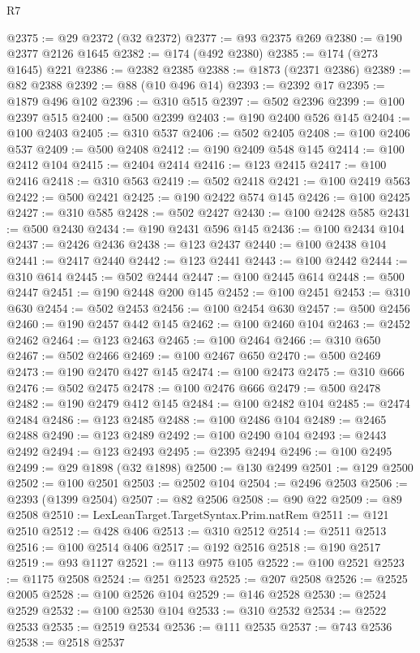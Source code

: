 \begin{lexlean}{R7}
\begin{coremodule}
@2375 := @29 @2372 (@32 @2372)
@2377 := @93 @2375 @269
@2380 := @190 @2377 @2126 @1645
@2382 := @174 (@492 @2380)
@2385 := @174 (@273 @1645) @221
@2386 := @2382 @2385
@2388 := @1873 (@2371 @2386)
@2389 := @82 @2388
@2392 := @88 (@10 @496 @14)
@2393 := @2392 @17
@2395 := @1879 @496 @102
@2396 := @310 @515
@2397 := @502 @2396
@2399 := @100 @2397 @515
@2400 := @500 @2399
@2403 := @190 @2400 @526 @145
@2404 := @100 @2403
@2405 := @310 @537
@2406 := @502 @2405
@2408 := @100 @2406 @537
@2409 := @500 @2408
@2412 := @190 @2409 @548 @145
@2414 := @100 @2412 @104
@2415 := @2404 @2414
@2416 := @123 @2415
@2417 := @100 @2416
@2418 := @310 @563
@2419 := @502 @2418
@2421 := @100 @2419 @563
@2422 := @500 @2421
@2425 := @190 @2422 @574 @145
@2426 := @100 @2425
@2427 := @310 @585
@2428 := @502 @2427
@2430 := @100 @2428 @585
@2431 := @500 @2430
@2434 := @190 @2431 @596 @145
@2436 := @100 @2434 @104
@2437 := @2426 @2436
@2438 := @123 @2437
@2440 := @100 @2438 @104
@2441 := @2417 @2440
@2442 := @123 @2441
@2443 := @100 @2442
@2444 := @310 @614
@2445 := @502 @2444
@2447 := @100 @2445 @614
@2448 := @500 @2447
@2451 := @190 @2448 @200 @145
@2452 := @100 @2451
@2453 := @310 @630
@2454 := @502 @2453
@2456 := @100 @2454 @630
@2457 := @500 @2456
@2460 := @190 @2457 @442 @145
@2462 := @100 @2460 @104
@2463 := @2452 @2462
@2464 := @123 @2463
@2465 := @100 @2464
@2466 := @310 @650
@2467 := @502 @2466
@2469 := @100 @2467 @650
@2470 := @500 @2469
@2473 := @190 @2470 @427 @145
@2474 := @100 @2473
@2475 := @310 @666
@2476 := @502 @2475
@2478 := @100 @2476 @666
@2479 := @500 @2478
@2482 := @190 @2479 @412 @145
@2484 := @100 @2482 @104
@2485 := @2474 @2484
@2486 := @123 @2485
@2488 := @100 @2486 @104
@2489 := @2465 @2488
@2490 := @123 @2489
@2492 := @100 @2490 @104
@2493 := @2443 @2492
@2494 := @123 @2493
@2495 := @2395 @2494
@2496 := @100 @2495
@2499 := @29 @1898 (@32 @1898)
@2500 := @130 @2499
@2501 := @129 @2500
@2502 := @100 @2501
@2503 := @2502 @104
@2504 := @2496 @2503
@2506 := @2393 (@1399 @2504)
@2507 := @82 @2506
@2508 := @90 @22
@2509 := @89 @2508
@2510 := LexLeanTarget.TargetSyntax.Prim.natRem
@2511 := @121 @2510
@2512 := @428 @406
@2513 := @310 @2512
@2514 := @2511 @2513
@2516 := @100 @2514 @406
@2517 := @192 @2516
@2518 := @190 @2517
@2519 := @93 @1127
@2521 := @113 @975 @105
@2522 := @100 @2521
@2523 := @1175 @2508
@2524 := @251 @2523
@2525 := @207 @2508
@2526 := @2525 @2005
@2528 := @100 @2526 @104
@2529 := @146 @2528
@2530 := @2524 @2529
@2532 := @100 @2530 @104
@2533 := @310 @2532
@2534 := @2522 @2533
@2535 := @2519 @2534
@2536 := @111 @2535
@2537 := @743 @2536
@2538 := @2518 @2537

\end{coremodule}
\end{lexlean}
